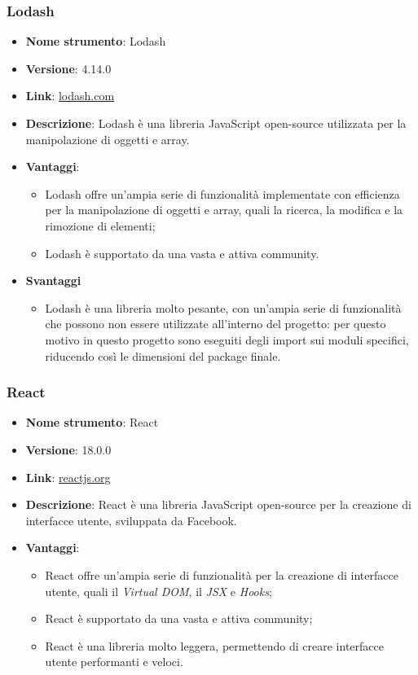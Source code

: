 \subsubsection{Lodash}
\begin{itemize}
      \item \textbf{Nome strumento}: Lodash
      \item \textbf{Versione}: 4.14.0
      \item \textbf{Link}: \href{https://lodash.com/}{lodash.com}
      \item \textbf{Descrizione}: Lodash è una libreria JavaScript open-source utilizzata per la manipolazione di oggetti e array.
      \item \textbf{Vantaggi}:
            \begin{itemize}
                  \item Lodash offre un'ampia serie di funzionalità implementate con efficienza per la manipolazione di oggetti e array,
                        quali la ricerca, la modifica e la rimozione di elementi;
                  \item Lodash è supportato da una vasta e attiva community.
            \end{itemize}
      \item \textbf{Svantaggi}
            \begin{itemize}
                  \item Lodash è una libreria molto pesante, con un'ampia serie di funzionalità che possono non essere utilizzate all'interno del progetto:
                        per questo motivo in questo progetto sono eseguiti degli import sui moduli specifici, riducendo così le dimensioni del package finale.
            \end{itemize}
\end{itemize}

\subsubsection{React}
\begin{itemize}
      \item \textbf{Nome strumento}: React
      \item \textbf{Versione}: 18.0.0
      \item \textbf{Link}: \href{https://reactjs.org/}{reactjs.org}
      \item \textbf{Descrizione}: React è una libreria JavaScript open-source per la creazione di interfacce utente, sviluppata da Facebook.
      \item \textbf{Vantaggi}:
            \begin{itemize}
                  \item React offre un'ampia serie di funzionalità per la creazione di interfacce utente, quali il \textit{Virtual DOM}, il \textit{JSX} e \textit{Hooks};
                  \item React è supportato da una vasta e attiva community;
                  \item React è una libreria molto leggera, permettendo di creare interfacce utente performanti e veloci.
            \end{itemize}
\end{itemize}

